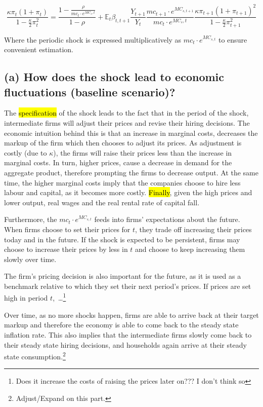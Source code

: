 \documentclass[12pt]{article}
\begin{document}
\begin{equation}
    \frac{\kappa \pi_t (1 + \pi_t)}{1 - \frac{\kappa}{2} \pi_t^2}
    = \frac{1 - \frac{\rho}{mc_t \cdot e^{MC_s,t}}}{1 - \rho}
    + \mathbb{E}_t \beta_{t,t+1}
    \frac{Y_{t+1}}{Y_t}
    \frac{mc_{t+1} \cdot e^{MC_{s,t+1}}}{mc_t \cdot e^{MC_s,t}}
    \frac{\kappa \pi_{t+1} (1 + \pi_{t+1})^{2}}{1 - \frac{\kappa}{2} \pi_{t+1}^2}
\end{equation}

Where the periodic shock is expressed multiplicatively as $mc_t \cdot e^{MC_{s, t}}$ to ensure convenient estimation.

\subsection*{(a) How does the shock lead to economic fluctuations (baseline scenario)?}

The \hl{specification} of the shock leads to the fact that in the period of the shock, intermediate firms will adjust their prices and revise their hiring decisions. The economic intuition behind this is that an increase in marginal costs, decreases the markup of the firm which then chooses to adjust its prices. As adjustment is costly (due to $\kappa$), the firms will raise their prices less than the increase in marginal costs. In turn, higher prices, cause a decrease in demand for the aggregate product, therefore prompting the firms to decrease output. At the same time, the higher marginal costs imply that the companies choose to hire less labour and capital, as it becomes more costly. \hl{Finally}, given the high prices and lower output, real wages and the real rental rate of capital fall.

Furthermore, the $mc_t \cdot e^{MC_{s, t}}$ feeds into firms' expectations about the future. When firms choose to set their prices for $t$, they trade off increasing their prices today and in the future. If the shock is expected to be persistent, firms may choose to increase their prices by less in $t$ and choose to keep increasing them slowly over time. 

The firm's pricing decision is also important for the future, as it is used as a benchmark relative to which they set their next period's prices. If prices are set high in period $t$,\ \dots\footnote{Does it increase the costs of raising the prices later on??? I don't think so}

Over time, as no more shocks happen, firms are able to arrive back at their target markup and therefore the economy is able to come back to the steady state inflation rate. This also implies that the intermediate firms slowly come back to their steady state hiring decisions, and households again arrive at their steady state consumption.\footnote{Adjust/Expand on this part.}
\end{document}
